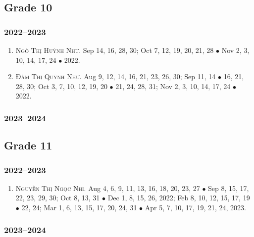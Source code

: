 \documentclass{article}
\begin{document}

\subsection{Grade 10}

\subsubsection{2022--2023}

\begin{enumerate}
	\item \textsc{Ngô Thị Huỳnh Như.} {\sf[In]} Sep 14, 16, 28, 30; Oct 7, 12, 19, 20, 21, 28 $\bullet$ Nov 2, 3, 10, 14, 17, 24 $\bullet$ 2022. {\sf[Out]}
	\item \textsc{Đàm Thị Quỳnh Như.} {\sf[In]} Aug 9, 12, 14, 16, 21, 23, 26, 30; Sep 11, 14 $\bullet$ 16, 21, 28, 30; Oct 3, 7, 10, 12, 19, 20 $\bullet$ 21, 24, 28, 31; Nov 2, 3, 10, 14, 17, 24 $\bullet$ 2022. {\sf[Out]}
\end{enumerate}

\subsubsection{2023--2024}


\subsection{Grade 11}

\subsubsection{2022--2023}

\begin{enumerate}
	\item \textsc{Nguyễn Thị Ngọc Nhi.} {\sf[In]} Aug 4, 6, 9, 11, 13, 16, 18, 20, 23, 27 $\bullet$ Sep 8, 15, 17, 22, 23, 29, 30; Oct 8, 13, 31 $\bullet$ Dec 1, 8,  15, 26, 2022; Feb 8, 10, 12, 15, 17, 19 $\bullet$ 22, 24; Mar 1, 6, 13, 15, 17, 20, 24, 31 $\bullet$ Apr 5, 7, 10, 17, 19, 21, 24, 2023.
\end{enumerate}

\subsubsection{2023--2024}
\end{document}
